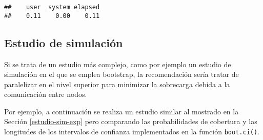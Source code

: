 \documentclass[
]{book}
\theoremstyle{break}
\theoremstyle{definition}
\theoremstyle{definition}
\theoremstyle{definition}
\theoremstyle{remark}
\begin{document}
\begin{verbatim}
##    user  system elapsed 
##    0.11    0.00    0.11
\end{verbatim}

\hypertarget{estudio-sim-boot}{%
\subsection{Estudio de simulación}\label{estudio-sim-boot}}

Si se trata de un estudio más complejo, como por ejemplo un estudio de simulación
en el que se emplea bootstrap, la recomendación sería tratar de paralelizar
en el nivel superior para minimizar la sobrecarga debida a la comunicación
entre nodos.

Por ejemplo, a continuación se realiza un estudio similar al mostrado en la Sección \ref{estudio-sim-exp}
pero comparando las probabilidades de cobertura y las longitudes de los
intervalos de confianza implementados en la función \texttt{boot.ci()}.
\end{document}
